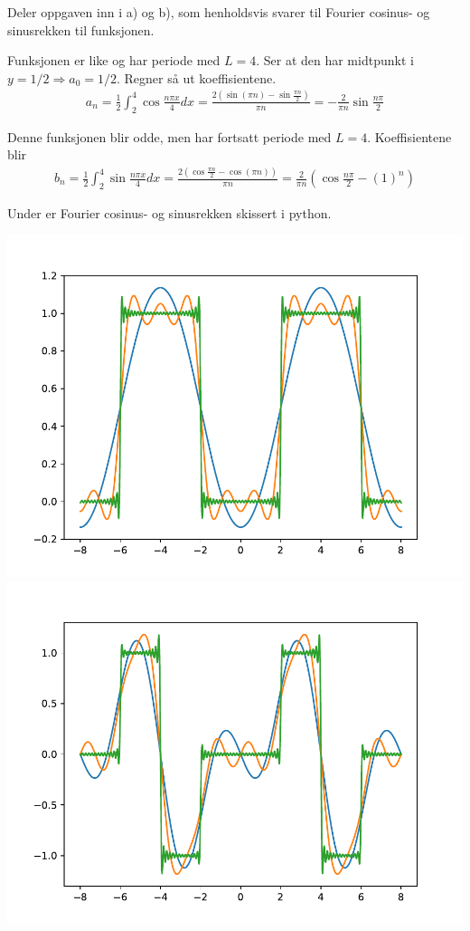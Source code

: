 \documentclass[11pt, a4paper, norsk]{NTNUoving}
\begin{document}
\begin{oppgave}[24]
  Deler oppgaven inn i a) og b), som henholdsvis svarer til Fourier cosinus- og sinusrekken til funksjonen.
  \begin{punkt}
    Funksjonen er like og har periode med $L=4$. Ser at den har midtpunkt i $y=1/2\Rightarrow a_{0}=1/2$. Regner så ut koeffisientene.
    \begin{align*}
      a_{n}=\frac{1}{2}\int_{2}^{4}\cos\frac{n\pi x}{4}dx = \frac{2(\sin(\pi n)-\sin\frac{\pi n}{2})}{\pi n} = -\frac{2}{\pi n}\sin\frac{n\pi}{2}
    \end{align*}
  \end{punkt}
  \begin{punkt}
    Denne funksjonen blir odde, men har fortsatt periode med $L = 4$. Koeffisientene blir
    \begin{align*}
      b_{n}=\frac{1}{2}\int_{2}^{4}\sin\frac{n\pi x}{4} dx= \frac{2(\cos\frac{\pi n}{2}-\cos(\pi n))}{\pi n} = \frac{2}{\pi n}\left(\cos\frac{n\pi}{2}-(1)^{n}\right)
    \end{align*}
  \end{punkt}
  Under er Fourier cosinus- og sinusrekken skissert i python.
  \begin{center}
    \includegraphics[scale=0.42]{11.2.24}
    \includegraphics[scale=0.42]{11.2.24b}
  \end{center}
\end{oppgave}
\end{document}
